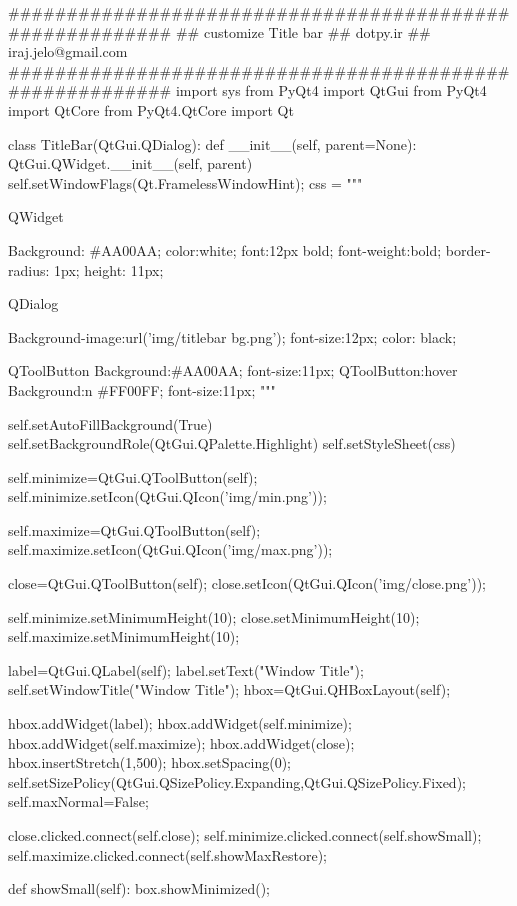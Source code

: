 \begin{python}
#########################################################
## customize Title bar
## dotpy.ir
## iraj.jelo@gmail.com
#########################################################
import sys
from PyQt4 import QtGui
from PyQt4 import QtCore
from PyQt4.QtCore import Qt


class TitleBar(QtGui.QDialog):
    def __init__(self, parent=None):
        QtGui.QWidget.__init__(self, parent)
        self.setWindowFlags(Qt.FramelessWindowHint);
        css = """

QWidget
{
Background: #AA00AA;
color:white;
font:12px bold;
font-weight:bold;
border-radius: 1px;
height: 11px;

}
QDialog{
Background-image:url('img/titlebar bg.png');
font-size:12px;
color: black;

}
QToolButton{
Background:#AA00AA;
font-size:11px;
}
QToolButton:hover{
Background:n #FF00FF;
font-size:11px;
}
"""

        self.setAutoFillBackground(True)
        self.setBackgroundRole(QtGui.QPalette.Highlight)
        self.setStyleSheet(css) 

        self.minimize=QtGui.QToolButton(self);
        self.minimize.setIcon(QtGui.QIcon('img/min.png'));

        self.maximize=QtGui.QToolButton(self);
        self.maximize.setIcon(QtGui.QIcon('img/max.png'));

        close=QtGui.QToolButton(self);
        close.setIcon(QtGui.QIcon('img/close.png'));

        self.minimize.setMinimumHeight(10);
        close.setMinimumHeight(10);
        self.maximize.setMinimumHeight(10);

        label=QtGui.QLabel(self);
        label.setText("Window Title");
        self.setWindowTitle("Window Title");
        hbox=QtGui.QHBoxLayout(self);

        hbox.addWidget(label);
        hbox.addWidget(self.minimize);
        hbox.addWidget(self.maximize);
        hbox.addWidget(close);
        hbox.insertStretch(1,500);
        hbox.setSpacing(0);
        self.setSizePolicy(QtGui.QSizePolicy.Expanding,QtGui.QSizePolicy.Fixed);
        self.maxNormal=False;

        close.clicked.connect(self.close);
        self.minimize.clicked.connect(self.showSmall);
        self.maximize.clicked.connect(self.showMaxRestore);


    def showSmall(self):
        box.showMinimized();


\end{python}
